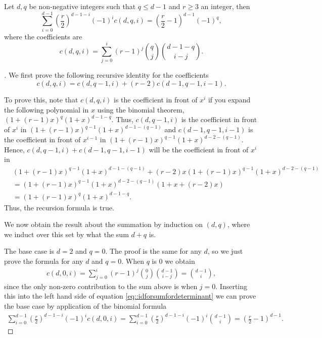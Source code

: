 \documentclass{biometrika}
\begin{document}
\begin{lemma}
\label{lem::forsum}
    Let $d,q$ be non-negative integers such that $q \leq d-1$ and $r \geq 3$ an integer, then 
    \begin{equation}
    \label{eq::idforsumfordeterminant}
            \sum_{i = 0}^{d-1} \left(\frac{r}{2} \right)^{d-1-i} (-1)^{i} c(d,q,i)  = \left(\frac{r}{2} -1 \right)^{d-1} (-1)^{q},
    \end{equation}
where the coefficients are $$c(d,q,i) = \sum_{j = 0}^{i } (r-1)^{j} \binom{q}{j} \binom{d-1-q}{i-j}.$$    
\end{lemma}
\begin{proof}[]
We first prove the following recursive identity for the coefficients
\begin{equation*}
    c(d,q,i) = c(d, q-1, i) + (r-2)c(d-1, q-1, i-1). 
\end{equation*}

To prove this, note that $c(d,q,i)$ is the coefficient in front of $x^{i}$ if you expand the following polynomial in $x$ using the binomial theorem, $(1+(r-1)x)^{q} (1+x)^{d-1-q}$. Thus, $c(d,q-1,i)$ is the coefficient in front of $x^{i}$ in $(1+(r-1)x)^{q-1} (1+x)^{d-1-(q-1)}$ and $c(d-1, q-1, i-1)$ is the coefficient in front of $x^{i-1}$ in $(1+(r-1)x)^{q-1} (1+x)^{d-2-(q-1)}$. Hence, $c(d, q-1, i) + c(d-1, q-1, i-1)$ will be the coefficient in front of $x^{i}$ in 
\begin{align*}
    &(1+(r-1)x)^{q-1} (1+x)^{d-1-(q-1)} + (r-2)x (1+(r-1)x)^{q-1} (1+x)^{d-2-(q-1)}  \\
    &=  (1+(r-1)x)^{q-1}(1+x)^{d-2-(q-1)} (1+x +(r-2)x) \\
    &=  (1+(r-1)x)^{q} (1+x)^{d-1-q}. 
\end{align*}
Thus, the recursion formula is true. 

We now obtain the result about the summation by induction on $(d,q)$, where we induct over this set by what the sum $d + q$ is. 

The base case is $d = 2$ and $q = 0$. The proof is the same for any $d$, so we just prove the formula for any $d$ and $q = 0$. When $q$ is 0 we obtain 
\begin{align*}
    c(d,0,i) = \sum_{j = 0}^{i } (r-1)^{j} \binom{0}{j} \binom{d-1}{i-j} = \binom{d-1}{i},
\end{align*}
since the only non-zero contribution to the sum above is when $j = 0$. Inserting this into the left hand side of equation \eqref{eq::idforsumfordeterminant} we can prove the base case by application of the binomial formula
\begin{align*}
    \sum_{i = 0}^{d-1} \left(\frac{r}{2} \right)^{d-1-i} (-1)^{i} c(d,0,i) = \sum_{i = 0}^{d-1} \left(\frac{r}{2} \right)^{d-1-i} (-1)^{i} \binom{d-1}{i} = \left( \frac{r}{2} -1 \right)^{d-1}.  
\end{align*}


\end{proof}
\end{document}
